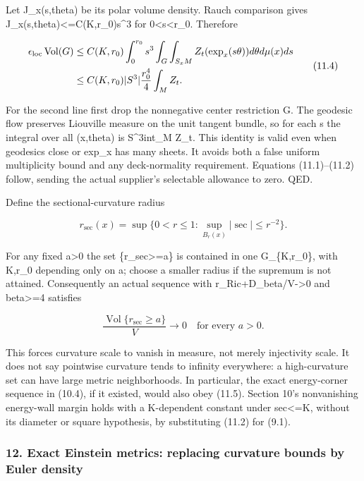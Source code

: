 \documentclass[
  10pt,
]{article}
\begin{document}
Let J\_x(s,theta) be its polar volume density. Rauch comparison gives
J\_x(s,theta)\textless=C(K,r\_0)s\^{}3 for 0\textless s\textless r\_0.
Therefore

\[
\begin{aligned}
 \epsilon_{\rm loc}\operatorname{Vol}(G)
 &\le C(K,r_0)\int_0^{r_0}s^3
          \int_G\int_{S_xM}Z_t(\exp_x(s\theta))d\theta d\mu(x)ds\\
 &\le C(K,r_0)|S^3|\frac{r_0^4}{4}\int_M Z_t.
\end{aligned}                                                     \tag{11.4}
\]

For the second line first drop the nonnegative center restriction G. The
geodesic flow preserves Liouville measure on the unit tangent bundle, so
for each s the integral over all (x,theta) is
\textbar S\^{}3\textbar int\_M Z\_t. This identity is valid even when
geodesics close or exp\_x has many sheets. It avoids both a false
uniform multiplicity bound and any deck-normality requirement. Equations
(11.1)--(11.2) follow, sending the actual supplier's selectable
allowance to zero. QED.

Define the sectional-curvature radius

\[
 r_{\sec}(x)=\sup\{0<r\le1:\sup_{B_r(x)}|\sec|\le r^{-2}\}.
\]

For any fixed a\textgreater0 the set \{r\_sec\textgreater=a\} is
contained in one G\_\{K,r\_0\}, with K,r\_0 depending only on a; choose
a smaller radius if the supremum is not attained. Consequently an actual
sequence with r\_Ric+D\_beta/V-\textgreater0 and beta\textgreater=4
satisfies

\[
       \frac{\operatorname{Vol}\{r_{\sec}\ge a\}}V\to0
                                  \quad\text{for every }a>0.    \tag{11.5}
\]

This forces curvature scale to vanish in measure, not merely injectivity
scale. It does not say pointwise curvature tends to infinity everywhere:
a high-curvature set can have large metric neighborhoods. In particular,
the exact energy-corner sequence in (10.4), if it existed, would also
obey (11.5). Section 10's nonvanishing energy-wall margin holds with a
K-dependent constant under \textbar sec\textbar\textless=K, without its
diameter or square hypothesis, by substituting (11.2) for (9.1).

\hypertarget{exact-einstein-metrics-replacing-curvature-bounds-by-euler-density}{%
\subsubsection{12. Exact Einstein metrics: replacing curvature bounds by
Euler
density}\label{exact-einstein-metrics-replacing-curvature-bounds-by-euler-density}}
\end{document}
